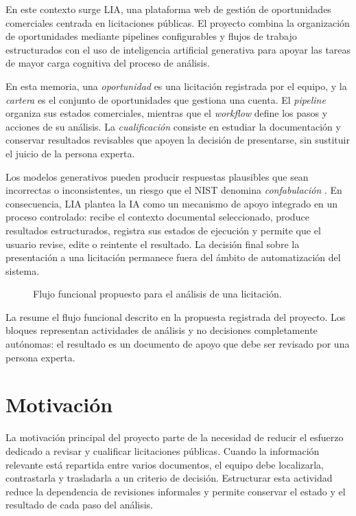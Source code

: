 En este contexto surge LIA, una plataforma web de gestión de oportunidades
comerciales centrada en licitaciones públicas. El proyecto combina la
organización de oportunidades mediante pipelines configurables y flujos de
trabajo estructurados con el uso de inteligencia artificial generativa para
apoyar las tareas de mayor carga cognitiva del proceso de análisis.

En esta memoria, una \emph{oportunidad} es una licitación registrada por el
equipo, y la \emph{cartera} es el conjunto de oportunidades que gestiona una
cuenta. El \emph{pipeline} organiza sus estados comerciales, mientras que el
\emph{workflow} define los pasos y acciones de su análisis. La
\emph{cualificación} consiste en estudiar la documentación y conservar
resultados revisables que apoyen la decisión de presentarse, sin sustituir el
juicio de la persona experta.

Los modelos generativos pueden producir respuestas plausibles que sean
incorrectas o inconsistentes, un riesgo que el NIST denomina
\emph{confabulación} \cite{autio2024}. En consecuencia, LIA plantea la IA como
un mecanismo de apoyo integrado en un proceso controlado: recibe el contexto
documental seleccionado, produce resultados estructurados, registra sus estados
de ejecución y permite que el usuario revise, edite o reintente el resultado.
La decisión final sobre la presentación a una licitación permanece fuera del
ámbito de automatización del sistema.

\begin{figure}[htbp]
  \centering
  \resizebox{\textwidth}{!}{
    
  }
  \caption{Flujo funcional propuesto para el análisis de una licitación.}
  \label{fig:tender-analysis-flow}
\end{figure}

La  resume el flujo funcional descrito en la
propuesta registrada del proyecto. Los bloques representan actividades de
análisis y no decisiones completamente autónomas: el resultado es un documento
de apoyo que debe ser revisado por una persona experta.

\section{Motivación}

La motivación principal del proyecto parte de la necesidad de reducir el
esfuerzo dedicado a revisar y cualificar licitaciones públicas. Cuando la
información relevante está repartida entre varios documentos, el equipo debe
localizarla, contrastarla y trasladarla a un criterio de decisión. Estructurar
esta actividad reduce la dependencia de revisiones informales y permite
conservar el estado y el resultado de cada paso del análisis.

